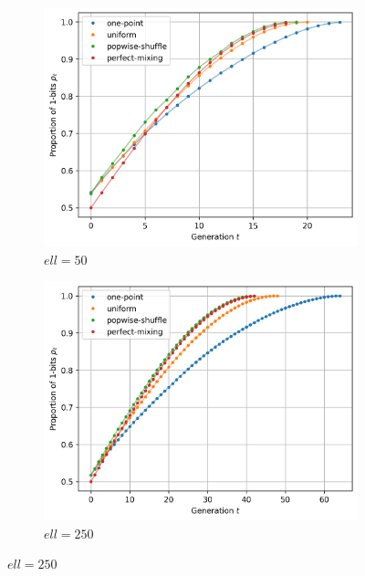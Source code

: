 \documentclass{article}
\begin{document}
\begin{enumerate}[label=(\alph*)]
      
      \begin{figure}[h]
            \centering
            \begin{subfigure}[b]{0.32\linewidth}
                  \centering
                  \includegraphics[width=\linewidth]{fig-uni_50.png}
                  \caption{$ell=50$}
                  \label{fig:uni-50}
            \end{subfigure}
            \hfill
            \begin{subfigure}[b]{0.32\linewidth}
                  \centering
                  \includegraphics[width=\linewidth]{fig-uni_250.png}
                  \caption{$ell=250$}
                  \label{fig:uni-250}
            \end{subfigure}

\end{figure}
\end{enumerate}
\end{document}
